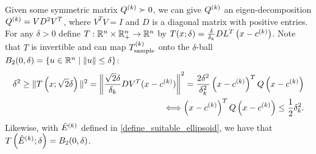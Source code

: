 Given some symmetric matrix ${Q^{(k)}} \succ 0$, we can give ${Q^{(k)}}$ an eigen-decomposition ${Q^{(k)}} = V D^2 V^T$,
where $V^TV = I$ and $D$ is a diagonal matrix with positive entries.
For any
$\delta > 0$ define $T:\mathbb R^n \times \mathbb R^n_+ \rightarrow \mathbb R^n$ by $T(x; \delta) = \frac{\delta}{\delta_k} DL^T\left(x - c^{(k)}\right)$.
Note that $T$ is invertible and can map ${T_{\text{sample}}^{(k)}}$ onto the $\delta$-ball
$B_2(0,\delta) = \left\{u \in \mathbb R^n \; | \; \|u\| \le \delta\right\}$:
\begin{align*}
\delta^2 \ge \|T\left(x; \sqrt{2}\delta\right)\|^2 = \left\|\frac {\sqrt{2}\delta} {\delta_k} DV^T(x - c^{(k)})\right \|^2
= \frac {2\delta^2} {\delta_k^2} \left(x - c^{(k)}\right)^TQ\left(x - c^{(k)}\right) \\
\Longleftrightarrow \left(x - c^{(k)}\right)^TQ\left(x - c^{(k)}\right) \le \frac 1 2 \delta_k^2.
\end{align*}
Likewise, with ${{\hat E}^{(k)}}$ defined in \cref{define_suitable_ellipsoid}, we have that
$T\left({{\hat E}^{(k)}}; \delta\right) = B_2(0, \delta)$.

